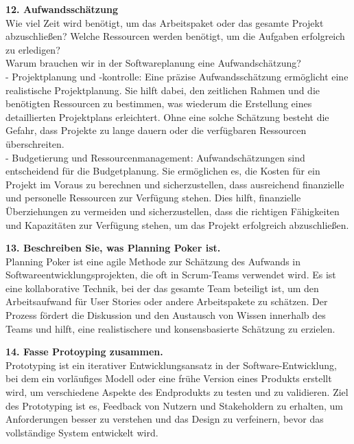 \documentclass{article}
\begin{document}
\textbf{12. Aufwandsschätzung}\\
Wie viel Zeit wird benötigt, um das Arbeitspaket oder das gesamte Projekt abzuschließen?
Welche Ressourcen werden benötigt, um die Aufgaben erfolgreich zu erledigen?\\
Warum brauchen wir in der Softwareplanung eine Aufwandschätzung?\\
- Projektplanung und -kontrolle:
Eine präzise Aufwandsschätzung ermöglicht eine realistische Projektplanung. Sie hilft dabei, den zeitlichen Rahmen und die benötigten Ressourcen zu bestimmen, was wiederum die Erstellung eines detaillierten Projektplans erleichtert. Ohne eine solche Schätzung besteht die Gefahr, dass Projekte zu lange dauern oder die verfügbaren Ressourcen überschreiten.\\
- Budgetierung und Ressourcenmanagement:
Aufwandschätzungen sind entscheidend für die Budgetplanung. Sie ermöglichen es, die Kosten für ein Projekt im Voraus zu berechnen und sicherzustellen, dass ausreichend finanzielle und personelle Ressourcen zur Verfügung stehen. Dies hilft, finanzielle Überziehungen zu vermeiden und sicherzustellen, dass die richtigen Fähigkeiten und Kapazitäten zur Verfügung stehen, um das Projekt erfolgreich abzuschließen.\\
\textbf{13. Beschreiben Sie, was Planning Poker ist.}\\
Planning Poker ist eine agile Methode zur Schätzung des Aufwands in Softwareentwicklungsprojekten, die oft in Scrum-Teams verwendet wird. Es ist eine kollaborative Technik, bei der das gesamte Team beteiligt ist, um den Arbeitsaufwand für User Stories oder andere Arbeitspakete zu schätzen. Der Prozess fördert die Diskussion und den Austausch von Wissen innerhalb des Teams und hilft, eine realistischere und konsensbasierte Schätzung zu erzielen. \\
\textbf{14. Fasse Protoyping zusammen.}\\
Prototyping ist ein iterativer Entwicklungsansatz in der Software-Entwicklung, bei dem ein vorläufiges Modell oder eine frühe Version eines Produkts erstellt wird, um verschiedene Aspekte des Endprodukts zu testen und zu validieren. Ziel des Prototyping ist es, Feedback von Nutzern und Stakeholdern zu erhalten, um Anforderungen besser zu verstehen und das Design zu verfeinern, bevor das vollständige System entwickelt wird.\\
\end{document}

